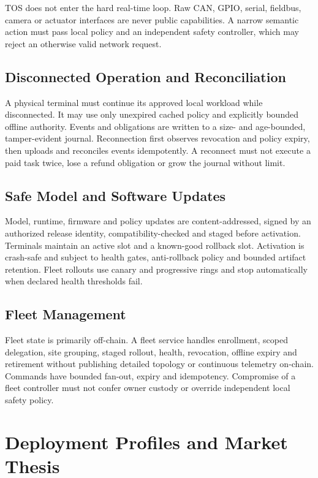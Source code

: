 \documentclass[11pt,oneside]{article}
\begin{document}
TOS does not enter the hard real-time loop. Raw CAN, GPIO, serial, fieldbus, camera or actuator
interfaces are never public capabilities. A narrow semantic action must pass local policy and
an independent safety controller, which may reject an otherwise valid network request.

\subsection{Disconnected Operation and Reconciliation}

A physical terminal must continue its approved local workload while disconnected. It may use
only unexpired cached policy and explicitly bounded offline authority. Events and obligations
are written to a size- and age-bounded, tamper-evident journal. Reconnection first observes
revocation and policy expiry, then uploads and reconciles events idempotently. A reconnect
must not execute a paid task twice, lose a refund obligation or grow the journal without
limit.

\subsection{Safe Model and Software Updates}

Model, runtime, firmware and policy updates are content-addressed, signed by an authorized
release identity, compatibility-checked and staged before activation. Terminals maintain an
active slot and a known-good rollback slot. Activation is crash-safe and subject to health
gates, anti-rollback policy and bounded artifact retention. Fleet rollouts use canary and
progressive rings and stop automatically when declared health thresholds fail.

\subsection{Fleet Management}

Fleet state is primarily off-chain. A fleet service handles enrollment, scoped delegation,
site grouping, staged rollout, health, revocation, offline expiry and retirement without
publishing detailed topology or continuous telemetry on-chain. Commands have bounded fan-out,
expiry and idempotency. Compromise of a fleet controller must not confer owner custody or
override independent local safety policy.


\section{Deployment Profiles and Market Thesis}
\end{document}
